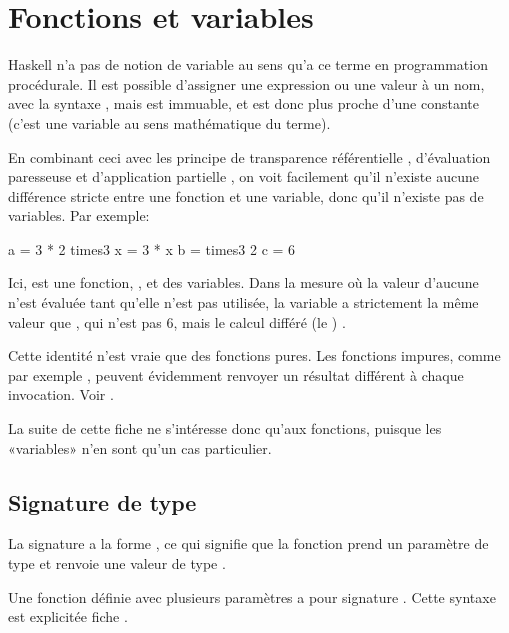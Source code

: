 \section{Fonctions et variables}
\label{functions-and-variables}

Haskell n'a pas de notion de variable au sens qu'a ce terme en programmation procédurale. Il est possible d'assigner une expression ou une valeur à un nom, avec la syntaxe , mais  est immuable, et est donc plus proche d'une constante (c'est une variable au sens mathématique du terme).

En combinant ceci avec les principe de transparence référentielle , d'évaluation paresseuse  et d'application partielle , on voit facilement qu'il n'existe aucune différence stricte entre une fonction et une variable, donc qu'il n'existe pas de variables. Par exemple:

\begin{haskellcode}
a = 3 * 2
times3 x = 3 * x
b = times3 2
c = 6
\end{haskellcode}

Ici,  est une fonction, ,  et  des variables. Dans la mesure où la valeur d'aucune n'est évaluée tant qu'elle n'est pas utilisée, la variable  a strictement la même valeur que , qui n'est pas 6, mais le calcul différé (le ) .

\begin{warnbox}
Cette identité n'est vraie que des fonctions pures. Les fonctions impures, comme par exemple , peuvent évidemment renvoyer un résultat différent à chaque invocation. Voir .
\end{warnbox}

La suite de cette fiche ne s'intéresse donc qu'aux fonctions, puisque les «variables» n'en sont qu'un cas particulier.

\subsection{Signature de type}
\label{type-signatures}

La signature a la forme , ce qui signifie que la fonction prend un paramètre de type  et renvoie une valeur de type .

Une fonction définie avec plusieurs paramètres a pour signature . Cette syntaxe est explicitée fiche .

